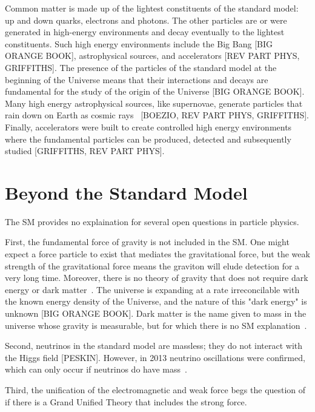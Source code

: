 Common matter is made up of the lightest constituents of the standard model: up and down quarks, electrons and photons. The other particles are or were generated in high-energy environments and decay eventually to the lightest constituents. Such high energy environments include the Big Bang [BIG ORANGE BOOK], astrophysical sources, and accelerators [REV PART PHYS, GRIFFITHS]. The presence of the particles of the standard model at the beginning of the Universe means that their interactions and decays are fundamental for the study of the origin of the Universe [BIG ORANGE BOOK]. Many high energy astrophysical sources, like supernovae, generate particles that rain down on Earth as cosmic rays~\cite{boezio_chemical_2012} [BOEZIO, REV PART PHYS, GRIFFITHS]. Finally, accelerators were built to create controlled high energy environments where the fundamental particles can be produced, detected and subsequently studied [GRIFFITHS, REV PART PHYS].

\section{Beyond the Standard Model}

The SM provides no explaination for several open questions in particle physics.

First, the fundamental force of gravity is not included in the SM. One might expect a force particle to exist that mediates the gravitational force, but the weak strength of the gravitational force means the graviton will elude detection for a very long time. Moreover, there is no theory of gravity that does not require dark energy or dark matter~\cite{zyla_review_2020}. The universe is expanding at a rate irreconcilable with the known energy density of the Universe, and the nature of this "dark energy" is unknown [BIG ORANGE BOOK]. Dark matter is the name given to mass in the universe whose gravity is measurable, but for which there is no SM explanation~\cite{munoz_dark_2004}.

Second, neutrinos in the standard model are massless; they do not interact with the Higgs field [PESKIN]. However, in 2013 neutrino oscillations were confirmed, which can only occur if neutrinos do have mass~\cite{aharmim_combined_2013}. 

Third, the unification of the electromagnetic and weak force begs the question of if there is a Grand Unified Theory that includes the strong force. 

